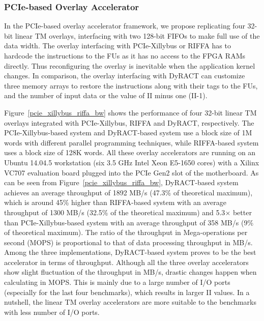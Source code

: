 \subsubsection{PCIe-based Overlay Accelerator}
In the PCIe-based overlay accelerator framework, we propose replicating four 32-bit linear TM overlays, interfacing with two 128-bit FIFOs to make full use of the data width.
The overlay interfacing with PCIe-Xillybus or RIFFA has to hardcode the instructions to the FUs as it has no access to the FPGA RAMs directly. 
Thus reconfiguring the overlay is inevitable when the application kernel changes. 
In comparison, the overlay interfacing with DyRACT can customize three memory arrays to restore the instructions along with their tags to the FUs, and the number of input data or the value of II minus one (II-1). 


Figure~\ref{pcie_xillybus_riffa_bw} shows the performance of four 32-bit linear TM overlays integrated with PCIe-Xillybus, RIFFA and DyRACT, respectively. 
The PCIe-Xillybus-based system and DyRACT-based system use a block size of 1M words with different parallel programming techniques, while RIFFA-based system uses a block size of 128K words.
All these overlay accelerators are running on an Ubuntu 14.04.5 workstation (six 3.5 GHz Intel Xeon E5-1650 cores) with a Xilinx VC707 evaluation board plugged into the PCIe Gen2 slot of the motherboard. 
As can be seen from Figure~\ref{pcie_xillybus_riffa_bw}, DyRACT-based system achieves an average throughput of 1892 MB/s (47.3\% of theoretical maximum), which is around 45\% higher than RIFFA-based system with an average throughput of 1300 MB/s (32.5\% of the theoretical maximum) and 5.3$\times$ better than PCIe-Xillybus-based system with an average throughput of 358 MB/s (9\% of theoretical maximum). 
The ratio of the throughput in Mega-operations per second (MOPS) is proportional to that of data processing throughput in MB/s. 
Among the three implementations, DyRACT-based system proves to be the best accelerator in terms of throughput. 
Although all the three overlay accelerators show slight fluctuation of the throughput in MB/s, drastic changes happen when calculating in MOPS. 
This is mainly due to a large number of I/O ports (especially for the last four benchmarks), which results in larger II values. 
In a nutshell, the linear TM overlay accelerators are more suitable to the benchmarks with less number of I/O ports. 



